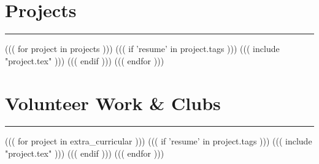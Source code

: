 \documentclass[letterpaper]{article}
\newcommand\textstyleMainColor[1]{\textcolor{toolPrimaryText}{#1}}
\begin{document}
\clearpage

\section{\textstyleMainColor{Projects}}
\hrule height 0.2pt
\vspace{2pt}
((( for project in projects )))
((( if 'resume' in project.tags )))
((( include "project.tex" )))
((( endif )))
((( endfor )))

\section{\textstyleMainColor{Volunteer Work \& Clubs}}
\hrule height 0.2pt
\vspace{2pt}
((( for project in extra_curricular )))
((( if 'resume' in project.tags )))
((( include "project.tex" )))
((( endif )))
((( endfor )))
\end{document}
